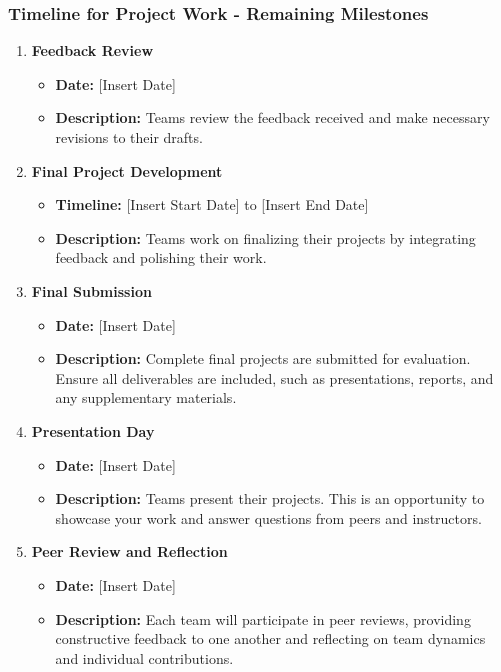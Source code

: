 \documentclass[aspectratio=169]{beamer}
\begin{document}
\begin{frame}[fragile]
    \frametitle{Timeline for Project Work - Remaining Milestones}
    \begin{enumerate}[resume]
        \item \textbf{Feedback Review}
        \begin{itemize}
            \item \textbf{Date:} [Insert Date]
            \item \textbf{Description:} Teams review the feedback received and make necessary revisions to their drafts.
        \end{itemize}

        \item \textbf{Final Project Development}
        \begin{itemize}
            \item \textbf{Timeline:} [Insert Start Date] to [Insert End Date]
            \item \textbf{Description:} Teams work on finalizing their projects by integrating feedback and polishing their work.
        \end{itemize}

        \item \textbf{Final Submission}
        \begin{itemize}
            \item \textbf{Date:} [Insert Date]
            \item \textbf{Description:} Complete final projects are submitted for evaluation. Ensure all deliverables are included, such as presentations, reports, and any supplementary materials.
        \end{itemize}

        \item \textbf{Presentation Day}
        \begin{itemize}
            \item \textbf{Date:} [Insert Date]
            \item \textbf{Description:} Teams present their projects. This is an opportunity to showcase your work and answer questions from peers and instructors.
        \end{itemize}

        \item \textbf{Peer Review and Reflection}
        \begin{itemize}
            \item \textbf{Date:} [Insert Date]
            \item \textbf{Description:} Each team will participate in peer reviews, providing constructive feedback to one another and reflecting on team dynamics and individual contributions.
        \end{itemize}
    \end{enumerate}
\end{frame}
\end{document}

